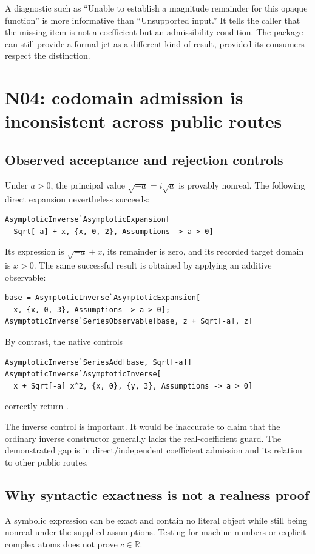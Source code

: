 \documentclass[11pt,letterpaper]{article}
\newcommand{\code}[1]{\texttt{\detokenize{#1}}}
\newcommand{\RR}{\mathbb R}
\begin{document}
A diagnostic such as ``Unable to establish a magnitude remainder for this opaque function'' is more informative than ``Unsupported input.'' It tells the caller that the missing item is not a coefficient but an admissibility condition. The package can still provide a formal jet as a different kind of result, provided its consumers respect the distinction.

\section{N04: codomain admission is inconsistent across public routes}\label{sec:n04}
\subsection{Observed acceptance and rejection controls}
Under $a>0$, the principal value $\sqrt{-a}=i\sqrt a$ is provably nonreal. The following direct expansion nevertheless succeeds:
\begin{lstlisting}
AsymptoticInverse`AsymptoticExpansion[
  Sqrt[-a] + x, {x, 0, 2}, Assumptions -> a > 0]
\end{lstlisting}
Its expression is $\sqrt{-a}+x$, its remainder is zero, and its recorded target domain is $x>0$. The same successful result is obtained by applying an additive observable:
\begin{lstlisting}
base = AsymptoticInverse`AsymptoticExpansion[
  x, {x, 0, 3}, Assumptions -> a > 0];
AsymptoticInverse`SeriesObservable[base, z + Sqrt[-a], z]
\end{lstlisting}
By contrast, the native controls
\begin{lstlisting}
AsymptoticInverse`SeriesAdd[base, Sqrt[-a]]
AsymptoticInverse`AsymptoticInverse[
  x + Sqrt[-a] x^2, {x, 0}, {y, 3}, Assumptions -> a > 0]
\end{lstlisting}
correctly return \code{Failure["UnprovedRealCoefficient",...]}.

The inverse control is important. It would be inaccurate to claim that the ordinary inverse constructor generally lacks the real-coefficient guard. The demonstrated gap is in direct/independent coefficient admission and its relation to other public routes.

\subsection{Why syntactic exactness is not a realness proof}
A symbolic expression can be exact and contain no literal \code{Complex} object while still being nonreal under the supplied assumptions. Testing for machine numbers or explicit complex atoms does not prove $c\in\RR$.
\end{document}
